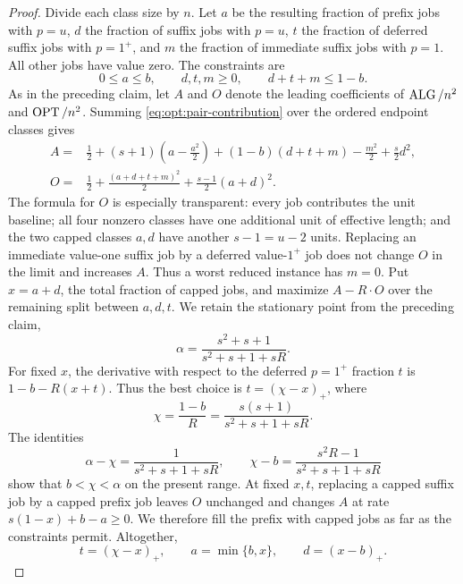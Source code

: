 \begin{proof}
Divide each class size by $n$.  Let $a$ be the resulting fraction of prefix
jobs with $p=u$, $d$ the fraction of suffix jobs with $p=u$, $t$ the fraction
of deferred suffix jobs with $p=1^+$, and $m$ the fraction of immediate
suffix jobs with $p=1$.  All other jobs have value zero.  The constraints are
\begin{equation}
 0\le a\le b,
 \qquad d,t,m\ge0,
 \qquad d+t+m\le1-b.
\end{equation}
As in the preceding claim, let $A$ and $O$ denote the leading coefficients
of $\operatorname{ALG}/n^2$ and $\operatorname{OPT}/n^2$.  Summing
\cref{eq:opt:pair-contribution} over the ordered endpoint classes gives
\begin{align}
 A={}&\frac12+(s+1)\left(a-\frac{a^2}{2}\right)
 +(1-b)(d+t+m)-\frac{m^2}{2}+\frac{s}{2}d^2,
 \label{eq:opt:ute-A}\\
 O={}&\frac12+\frac{(a+d+t+m)^2}{2}
 +\frac{s-1}{2}(a+d)^2.
 \label{eq:opt:ute-O}
\end{align}
The formula for $O$ is especially transparent: every job contributes the
unit baseline; all four nonzero classes have one additional unit of effective
length; and the two capped classes $a,d$ have another $s-1=u-2$ units.
Replacing an immediate value-one suffix job by a deferred value-$1^+$ job
does not change $O$ in the limit and increases $A$.  Thus a worst reduced
instance has $m=0$.  Put $x=a+d$, the total fraction of capped jobs, and maximize
$A-R\cdot O$ over the remaining split between $a,d,t$.  We retain the stationary
point from the preceding claim,
\[
 \alpha=\frac{s^2+s+1}{s^2+s+1+sR}.
\]
For fixed $x$, the derivative with respect to the deferred $p=1^+$ fraction $t$
is $1-b-R(x+t)$.  Thus the best choice is
$t=(\chi-x)_+$, where
\[
 \chi=\frac{1-b}{R}
      =\frac{s(s+1)}{s^2+s+1+sR}.
\]
The identities
\[
 \alpha-\chi=\frac1{s^2+s+1+sR},
 \qquad
 \chi-b=\frac{s^2R-1}{s^2+s+1+sR}
\]
show that $b<\chi<\alpha$ on the present range.  At fixed
$x,t$, replacing a capped suffix job by a capped prefix job leaves $O$
unchanged and changes $A$ at rate $s(1-x)+b-a\ge0$.  We therefore fill the
prefix with capped jobs as far as the constraints permit.  Altogether,
\begin{equation}
 t=(\chi-x)_+,
 \qquad
 a=\min\{b,x\},
 \qquad d=(x-b)_+.
 \label{eq:opt:ute-reduction}
\end{equation}


\end{proof}

